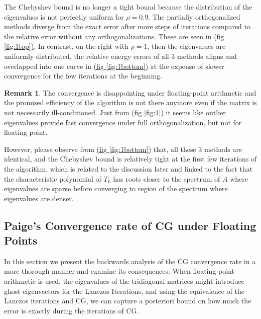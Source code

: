 \documentclass[]{article}
\theoremstyle{definition}
\newtheorem{remark}{Remark}[subsection]  %
\begin{document}
            The Chebyshev bound is no longer a tight bound because the distribution of the eigenvalues is not perfectly uniform for $\rho = 0.9$. The partially orthogonalized methods diverge from the exact error after more steps of iterations compared to the relative error without any orthogonalizations. These are seen in \hyperref[fig:1]{(fig \ref*{fig:1top})}. In contrast, on the right with $\rho = 1$, then the eigenvalues are uniformly distributed, the relative energy errors of all 3 methods aligns and overlapped into one curve in \hyperref[fig:1]{(fig \ref*{fig:1bottom})} at the expense of slower convergence for the few iterations at the beginning. 
            \begin{remark}
                The convergence is disappointing under floating-point arithmetic and the promised efficiency of the algorithm is not there anymore even if the matrix is not necessarily ill-conditioned. Just from \hyperref[fig:1]{(fig \ref*{fig:1})} it seems like outlier eigenvalues provide fast convergence under full orthogonalization, but not for floating point. 
                \par
                However, please observe from \hyperref[fig:1]{(fig \ref*{fig:1bottom})} that, all these 3 methods are identical, and the Chebyshev bound is relatively tight at the first few iterations of the algorithm, which is related to the discussion later and linked to the fact that the characteristic polynomial of $T_k$ has roots closer to the spectrum of $A$ where eigenvalues are sparse before converging to region of the spectrum where eigenvalues are denser. 
            \end{remark}
    \subsection{Paige's Convergence rate of CG under Floating Points}
        In this section we present the backwards analysis of the CG convergence rate in a more thorough manner and examine its consequences. When floating-point arithmetic is used, the eigenvalues of the tridiagonal matrices might introduce ghost eigenvectors for the Lanczos Iterations, and using the equivalence of the Lanczos iterations and CG, we can capture a posteriori bound on how much the error is exactly during the iterations of CG. 
\end{document}
